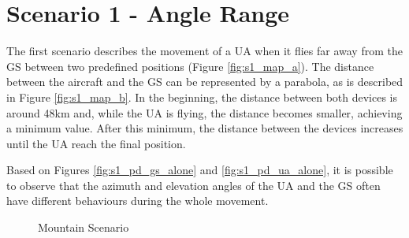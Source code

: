 \section{Scenario 1 - Angle Range}\label{sec:scenario1}
The first scenario describes the movement of a UA when it flies far away from the GS between two predefined positions (Figure \ref{fig:s1_map_a}). The distance between the aircraft and the GS can be represented by a parabola, as is described in Figure \ref{fig:s1_map_b}. In the beginning, the distance between both devices is around 48km and, while the UA is flying, the distance becomes smaller, achieving a minimum value. After this minimum, the distance between the devices increases until the UA reach the final position.

Based on Figures \ref{fig:s1_pd_gs_alone} and \ref{fig:s1_pd_ua_alone}, it is possible to observe that the azimuth and elevation angles of the UA and the GS often have different behaviours during the whole movement. 
  

\begin{figure}[H]
	\hfill
	\hfill
	\hfill
	\caption{Mountain Scenario}
	\label{fig:s1_map}
\end{figure}


